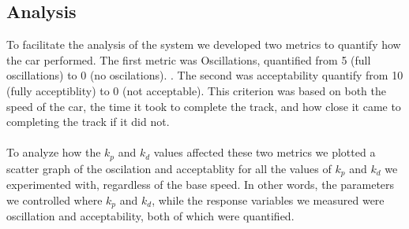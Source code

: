 \documentclass[12pt]{article}
\begin{document}
\begin{multicols}{2}
\section*{Analysis}
To facilitate the analysis of the system we developed two metrics to quantify how
the car performed. The first metric was Oscillations, quantified from 5 (full oscillations) to 0 (no oscilations).
. The second was acceptability quantify from 10 (fully acceptiblity) to 0 (not acceptable). This criterion was
based on both the speed of the car, the time it took to complete the track, and how close it came to 
completing the track if it did not. \\\\
To analyze how the $k_p$ and $k_d$ values affected these two metrics we plotted a scatter graph of the oscilation and acceptablity
for all the values of $k_p$ and $k_d$ we experimented with, regardless of the base speed. In other words, the parameters
we controlled where $k_p$ and $k_d$, while the response variables we measured were oscillation and acceptability, both of which were quantified. 


\end{multicols}
\end{document}
